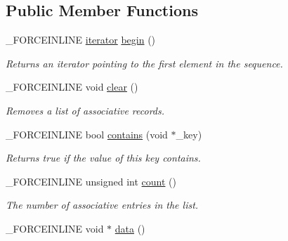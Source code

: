 \subsection*{Public Member Functions}
\begin{DoxyCompactItemize}
\item 
\hypertarget{classbt_1_1_map_void_int_af57829f2448f995097736d06f7040268}{\-\_\-\-F\-O\-R\-C\-E\-I\-N\-L\-I\-N\-E \hyperlink{classbt_1_1_map_void_int_1_1iterator}{iterator} \hyperlink{classbt_1_1_map_void_int_af57829f2448f995097736d06f7040268}{begin} ()}\label{classbt_1_1_map_void_int_af57829f2448f995097736d06f7040268}

\begin{DoxyCompactList}\small\item\em Returns an iterator pointing to the first element in the sequence. \end{DoxyCompactList}\item 
\hypertarget{classbt_1_1_map_void_int_a423f0be28e6807cbd35980478e3d04f8}{\-\_\-\-F\-O\-R\-C\-E\-I\-N\-L\-I\-N\-E void \hyperlink{classbt_1_1_map_void_int_a423f0be28e6807cbd35980478e3d04f8}{clear} ()}\label{classbt_1_1_map_void_int_a423f0be28e6807cbd35980478e3d04f8}

\begin{DoxyCompactList}\small\item\em Removes a list of associative records. \end{DoxyCompactList}\item 
\hypertarget{classbt_1_1_map_void_int_afa261d7e11a7b158f6c63f4233252efe}{\-\_\-\-F\-O\-R\-C\-E\-I\-N\-L\-I\-N\-E bool \hyperlink{classbt_1_1_map_void_int_afa261d7e11a7b158f6c63f4233252efe}{contains} (void $\ast$\-\_\-key)}\label{classbt_1_1_map_void_int_afa261d7e11a7b158f6c63f4233252efe}

\begin{DoxyCompactList}\small\item\em Returns true if the value of this key contains. \end{DoxyCompactList}\item 
\hypertarget{classbt_1_1_map_void_int_a60b4c25e1122ecadbe6fc0bbddaf5c8e}{\-\_\-\-F\-O\-R\-C\-E\-I\-N\-L\-I\-N\-E unsigned int \hyperlink{classbt_1_1_map_void_int_a60b4c25e1122ecadbe6fc0bbddaf5c8e}{count} ()}\label{classbt_1_1_map_void_int_a60b4c25e1122ecadbe6fc0bbddaf5c8e}

\begin{DoxyCompactList}\small\item\em The number of associative entries in the list. \end{DoxyCompactList}\item 
\hypertarget{classbt_1_1_map_void_int_aa5388bf2410c14bc887cfb5b79fb8c47}{\-\_\-\-F\-O\-R\-C\-E\-I\-N\-L\-I\-N\-E void $\ast$ \hyperlink{classbt_1_1_map_void_int_aa5388bf2410c14bc887cfb5b79fb8c47}{data} ()}\label{classbt_1_1_map_void_int_aa5388bf2410c14bc887cfb5b79fb8c47}


\end{DoxyCompactItemize}
